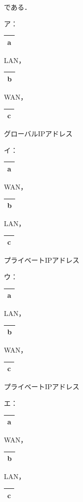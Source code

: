 である．\par\quad
ア：
\noindent\begin{tabular}{|c|}
  \hline
  a \\
  \hline
\end{tabular}
LAN，
\noindent\begin{tabular}{|c|}
  \hline
  b \\
  \hline
\end{tabular}
WAN，
\noindent\begin{tabular}{|c|}
  \hline
  c \\
  \hline
\end{tabular}
グローバルIPアドレス\par\quad
イ：
\noindent\begin{tabular}{|c|}
  \hline
  a \\
  \hline
\end{tabular}
WAN，
\noindent\begin{tabular}{|c|}
  \hline
  b \\
  \hline
\end{tabular}
LAN，
\noindent\begin{tabular}{|c|}
  \hline
  c \\
  \hline
\end{tabular}
プライベートIPアドレス\par\quad
ウ：
\noindent\begin{tabular}{|c|}
  \hline
  a \\
  \hline
\end{tabular}
LAN，
\noindent\begin{tabular}{|c|}
  \hline
  b \\
  \hline
\end{tabular}
WAN，
\noindent\begin{tabular}{|c|}
  \hline
  c \\
  \hline
\end{tabular}
プライベートIPアドレス\par\quad
エ：
\noindent\begin{tabular}{|c|}
  \hline
  a \\
  \hline
\end{tabular}
WAN，
\noindent\begin{tabular}{|c|}
  \hline
  b \\
  \hline
\end{tabular}
LAN，
\noindent\begin{tabular}{|c|}
  \hline
  c \\
  \hline
\end{tabular}
